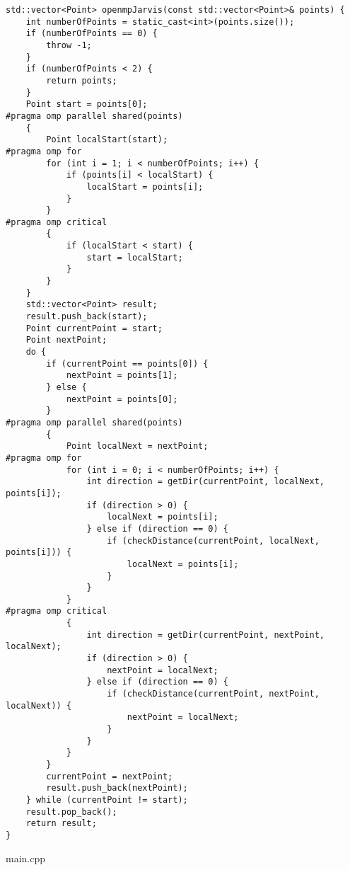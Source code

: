 \documentclass{report}
\begin{document}
\begin{lstlisting}
std::vector<Point> openmpJarvis(const std::vector<Point>& points) {
    int numberOfPoints = static_cast<int>(points.size());
    if (numberOfPoints == 0) {
        throw -1;
    }
    if (numberOfPoints < 2) {
        return points;
    }
    Point start = points[0];
#pragma omp parallel shared(points)
    {
        Point localStart(start);
#pragma omp for
        for (int i = 1; i < numberOfPoints; i++) {
            if (points[i] < localStart) {
                localStart = points[i];
            }
        }
#pragma omp critical
        {
            if (localStart < start) {
                start = localStart;
            }
        }
    }
    std::vector<Point> result;
    result.push_back(start);
    Point currentPoint = start;
    Point nextPoint;
    do {
        if (currentPoint == points[0]) {
            nextPoint = points[1];
        } else {
            nextPoint = points[0];
        }
#pragma omp parallel shared(points)
        {
            Point localNext = nextPoint;
#pragma omp for
            for (int i = 0; i < numberOfPoints; i++) {
                int direction = getDir(currentPoint, localNext, points[i]);
                if (direction > 0) {
                    localNext = points[i];
                } else if (direction == 0) {
                    if (checkDistance(currentPoint, localNext, points[i])) {
                        localNext = points[i];
                    }
                }
            }
#pragma omp critical
            {
                int direction = getDir(currentPoint, nextPoint, localNext);
                if (direction > 0) {
                    nextPoint = localNext;
                } else if (direction == 0) {
                    if (checkDistance(currentPoint, nextPoint, localNext)) {
                        nextPoint = localNext;
                    }
                }
            }
        }
        currentPoint = nextPoint;
        result.push_back(nextPoint);
    } while (currentPoint != start);
    result.pop_back();
    return result;
}
\end{lstlisting}
\par main.cpp
\end{document}
